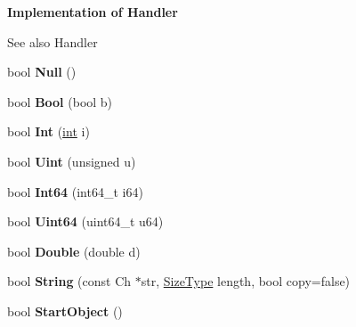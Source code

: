 \begin{Indent}{\bf Implementation of Handler}\par
{\em \begin{DoxySeeAlso}{See also}
Handler 
\end{DoxySeeAlso}
}\begin{DoxyCompactItemize}
\item 
\hypertarget{class_pretty_writer_acbcab646050e5e9204ab2b13c798092b}{}bool {\bfseries Null} ()\label{class_pretty_writer_acbcab646050e5e9204ab2b13c798092b}

\item 
\hypertarget{class_pretty_writer_afddf1586eeba72bc4fbb0e1346ced9b9}{}bool {\bfseries Bool} (bool b)\label{class_pretty_writer_afddf1586eeba72bc4fbb0e1346ced9b9}

\item 
\hypertarget{class_pretty_writer_a14da2a84e9f41ba42edf2819363be614}{}bool {\bfseries Int} (\hyperlink{_s_d_l__thread_8h_a6a64f9be4433e4de6e2f2f548cf3c08e}{int} i)\label{class_pretty_writer_a14da2a84e9f41ba42edf2819363be614}

\item 
\hypertarget{class_pretty_writer_a65227d9de9a9f92eb3ca83c616a9c809}{}bool {\bfseries Uint} (unsigned u)\label{class_pretty_writer_a65227d9de9a9f92eb3ca83c616a9c809}

\item 
\hypertarget{class_pretty_writer_a2ce0d71e221d72b8cf17d2b60ae610af}{}bool {\bfseries Int64} (int64\+\_\+t i64)\label{class_pretty_writer_a2ce0d71e221d72b8cf17d2b60ae610af}

\item 
\hypertarget{class_pretty_writer_a888229dc2e5a15b2fd577b47e86a17b3}{}bool {\bfseries Uint64} (uint64\+\_\+t u64)\label{class_pretty_writer_a888229dc2e5a15b2fd577b47e86a17b3}

\item 
\hypertarget{class_pretty_writer_a20ffcf3ada1be664719f44cec76711ed}{}bool {\bfseries Double} (double d)\label{class_pretty_writer_a20ffcf3ada1be664719f44cec76711ed}

\item 
\hypertarget{class_pretty_writer_ae6cec4b69e86cff3121451f29e4862ef}{}bool {\bfseries String} (const Ch $\ast$str, \hyperlink{rapidjson_8h_a5ed6e6e67250fadbd041127e6386dcb5}{Size\+Type} length, bool copy=false)\label{class_pretty_writer_ae6cec4b69e86cff3121451f29e4862ef}

\item 
\hypertarget{class_pretty_writer_a445e063722149f86bf1a0cd7b8892f07}{}bool {\bfseries Start\+Object} ()\label{class_pretty_writer_a445e063722149f86bf1a0cd7b8892f07}


\end{DoxyCompactItemize}
\end{Indent}
